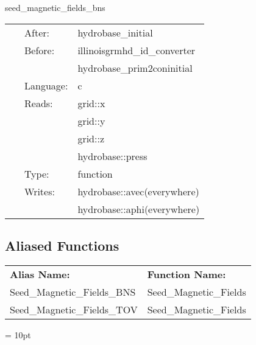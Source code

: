 \documentclass{article}
\begin{document}
\hspace{5mm} seed\_magnetic\_fields\_bns 

\hspace{5mm}{\it set up binary neutron star seed magnetic fields. } 


\hspace{5mm}

 \begin{tabular*}{160mm}{cll} 
~ & After:  & hydrobase\_initial \\ 
~ & Before:  & illinoisgrmhd\_id\_converter \\ 
~& ~ &hydrobase\_prim2coninitial\\ 
~ & Language:  & c \\ 
~ & Reads:  & grid::x \\ 
~& ~ &grid::y\\ 
~& ~ &grid::z\\ 
~& ~ &hydrobase::press\\ 
~ & Type:  & function \\ 
~ & Writes:  & hydrobase::avec(everywhere) \\ 
~& ~ &hydrobase::aphi(everywhere)\\ 
\end{tabular*} 


\subsection*{Aliased Functions}

\hspace{5mm}

 \begin{tabular*}{160mm}{ll} 

{\bf Alias Name:} ~~~~~~~ & {\bf Function Name:} \\ 
Seed\_Magnetic\_Fields\_BNS & Seed\_Magnetic\_Fields \\ 
Seed\_Magnetic\_Fields\_TOV & Seed\_Magnetic\_Fields \\ 
\end{tabular*} 



\vspace{5mm}\parskip = 10pt 
\end{document}
